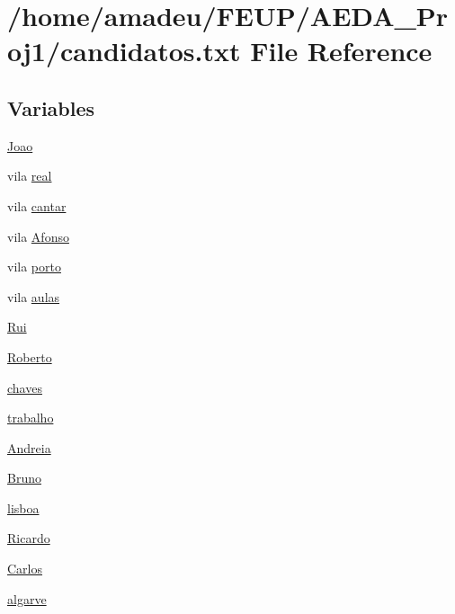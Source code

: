 \hypertarget{candidatos_8txt}{}\section{/home/amadeu/\+F\+E\+U\+P/\+A\+E\+D\+A\+\_\+\+Proj1/candidatos.txt File Reference}
\label{candidatos_8txt}
\subsection*{Variables}
\begin{DoxyCompactItemize}
\item 
\hyperlink{candidatos_8txt_a6414eb73c2395148093f8baa9e202616}{Joao}
\item 
vila \hyperlink{candidatos_8txt_a38df1df7696364439f75acd6d9e12db3}{real}
\item 
vila \hyperlink{candidatos_8txt_ad6218b62b1662d9aecef7e5202e38585}{cantar}
\item 
vila \hyperlink{candidatos_8txt_aab193da33fe7af81c3f38956a69ddc7b}{Afonso}
\item 
vila \hyperlink{candidatos_8txt_a50f37943ca5db274938bcee517a283cc}{porto}
\item 
vila \hyperlink{candidatos_8txt_a46623e301f4e03cb83c7fbeb8b1a7f43}{aulas}
\item 
\hyperlink{candidatos_8txt_afae26757e6180cef120017b01ac06140}{Rui}
\item 
\hyperlink{candidatos_8txt_ae97c2e40b26f85d0c45fbaf917d77502}{Roberto}
\item 
\hyperlink{candidatos_8txt_a1bb862406aa43586e05f956f8e9cabb1}{chaves}
\item 
\hyperlink{candidatos_8txt_ad6339a08af3e0ee859de202f9944116b}{trabalho}
\item 
\hyperlink{candidatos_8txt_aaa4a8e584997e199066f8f4910bf4ead}{Andreia}
\item 
\hyperlink{candidatos_8txt_a33e5ff5ddbb7118468c3dd458466532b}{Bruno}
\item 
\hyperlink{candidatos_8txt_afcb0be523bb30dc71d43c136869e3683}{lisboa}
\item 
\hyperlink{candidatos_8txt_a508a855615268f4003a2dcef768b5abe}{Ricardo}
\item 
\hyperlink{candidatos_8txt_a8c64f18bebe8b957cbc75ce757dd3af4}{Carlos}
\item 
\hyperlink{candidatos_8txt_ab0e2bf38e63ce27dd973bc5f810a5342}{algarve}
\item 

\end{DoxyCompactItemize}
